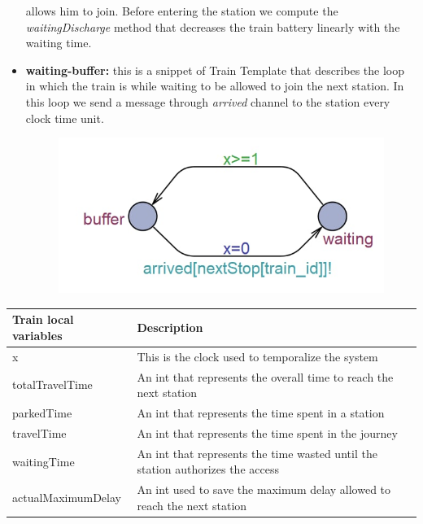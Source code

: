 \begin{itemize}
            allows him to join. Before entering the station we compute the \textit{waitingDischarge} method that decreases
            the train battery linearly with the waiting time.
    \item \textbf{waiting-buffer: }this is a snippet of Train Template that describes the loop in which the train is while
            waiting to be allowed to join the next station. In this loop we send a message through \emph{arrived} channel
            to the station every clock time unit.
            \begin{figure}[H]
                \centering
                \includegraphics[scale=0.56]{images/bufferSnippet.png}
            \end{figure}
\end{itemize}

\newpage

\begin{table} [H]
    \begin{tabu} to \textwidth {|X|X[3.5]|}
    \hline
    \textbf{Train local variables}              & \textbf{Description} \\  \hline
    x                       & This is the clock used to temporalize the system \\  \hline
    totalTravelTime         & An int that represents the overall time to reach the next station \\    \hline
    parkedTime              & An int that represents the time spent in a station \\    \hline
    travelTime              & An int that represents the time spent in the journey \\  \hline
    waitingTime             & An int that represents the time wasted until the station authorizes the access \\  \hline
    actualMaximumDelay      & An int used to save the maximum delay allowed to reach the next station \\    \hline
    \end{tabu}
\end{table}

\newpage
